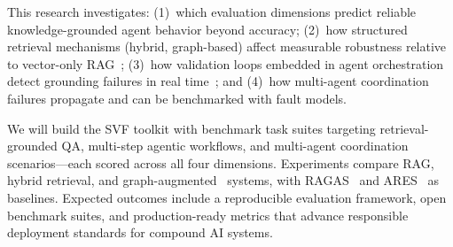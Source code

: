 \documentclass[conference, 10pt]{IEEEtran}
\begin{document}
This research investigates: (1)~which evaluation dimensions predict reliable knowledge-grounded agent behavior beyond accuracy; (2)~how structured retrieval mechanisms (hybrid, graph-based) affect measurable robustness relative to vector-only RAG~\cite{Lewis2020RAG}; (3)~how validation loops embedded in agent orchestration detect grounding failures in real time~\cite{Asai2024SelfRAG}; and (4)~how multi-agent coordination failures propagate and can be benchmarked with fault models.

We will build the SVF toolkit with benchmark task suites targeting retrieval-grounded QA, multi-step agentic workflows, and multi-agent coordination scenarios---each scored across all four dimensions. Experiments compare RAG, hybrid retrieval, and graph-augmented~\cite{Edge2024GraphRAG} systems, with RAGAS~\cite{Es2023RAGAS} and ARES~\cite{SaadFalcon2024ARES} as baselines. Expected outcomes include a reproducible evaluation framework, open benchmark suites, and production-ready metrics that advance responsible deployment standards for compound AI systems.



\end{document}
